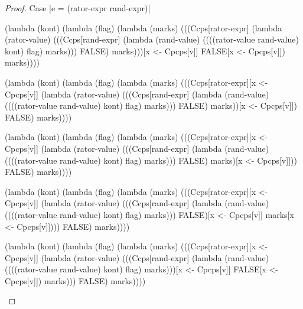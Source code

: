 \begin{proof}{Case \scheme|e = (rator-expr rand-expr)|}
\begin{schemeblock}
\begin{schemedisplay}
(lambda (kont)
   (lambda (flag)
     (lambda (marks)
       (((Ccps[rator-expr]
          (lambda (rator-value)
            (((Ccps[rand-expr]
               (lambda (rand-value)
                 ((((rator-value rand-value) kont) flag) marks)))
              FALSE) marks)))[x <- Cpcps[v]]
         FALSE[x <- Cpcps[v]]) marks))))
\end{schemedisplay}
\end{schemeblock}

\begin{schemeblock}
\begin{schemedisplay}
(lambda (kont)
   (lambda (flag)
     (lambda (marks)
       (((Ccps[rator-expr][x <- Cpcps[v]]
          (lambda (rator-value)
            (((Ccps[rand-expr]
               (lambda (rand-value)
                 ((((rator-value rand-value) kont) flag) marks)))
              FALSE) marks))[x <- Cpcps[v]])
         FALSE) marks))))
\end{schemedisplay}
\end{schemeblock}

\begin{schemeblock}
\begin{schemedisplay}
(lambda (kont)
   (lambda (flag)
     (lambda (marks)
       (((Ccps[rator-expr][x <- Cpcps[v]]
          (lambda (rator-value)
            (((Ccps[rand-expr]
               (lambda (rand-value)
                 ((((rator-value rand-value) kont) flag) marks)))
              FALSE) marks)[x <- Cpcps[v]]))
         FALSE) marks))))
\end{schemedisplay}
\end{schemeblock}

\begin{schemeblock}
\begin{schemedisplay}
(lambda (kont)
   (lambda (flag)
     (lambda (marks)
       (((Ccps[rator-expr][x <- Cpcps[v]]
          (lambda (rator-value)
            (((Ccps[rand-expr]
               (lambda (rand-value)
                 ((((rator-value rand-value) kont) flag) marks)))
              FALSE)[x <- Cpcps[v]] marks[x <- Cpcps[v]])))
         FALSE) marks))))
\end{schemedisplay}
\end{schemeblock}

\begin{schemeblock}
\begin{schemedisplay}
(lambda (kont)
   (lambda (flag)
     (lambda (marks)
       (((Ccps[rator-expr][x <- Cpcps[v]]
          (lambda (rator-value)
            (((Ccps[rand-expr]
               (lambda (rand-value)
                 ((((rator-value rand-value) kont) flag) marks)))[x <- Cpcps[v]]
              FALSE[x <- Cpcps[v]]) marks)))
         FALSE) marks))))
\end{schemedisplay}
\end{schemeblock}


\end{proof}
